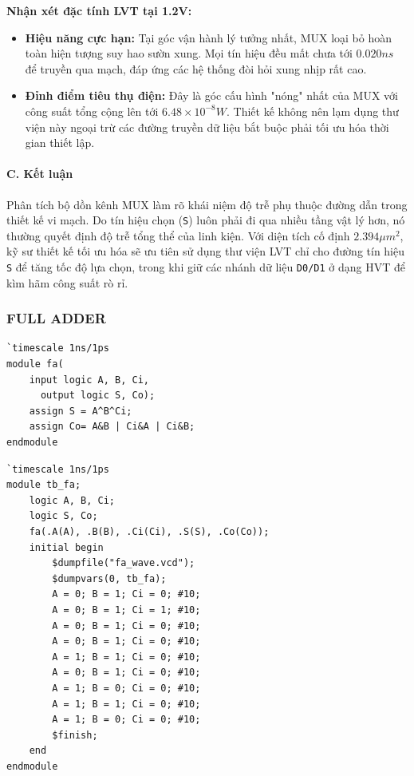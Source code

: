 \documentclass[12pt, a4paper, oneside]{article}
\begin{document}
\textbf{Nhận xét đặc tính LVT tại 1.2V:}
\begin{itemize}
    \item \textbf{Hiệu năng cực hạn:} Tại góc vận hành lý tưởng nhất, MUX loại bỏ hoàn toàn hiện tượng suy hao sườn xung. Mọi tín hiệu đều mất chưa tới $0.020ns$ để truyền qua mạch, đáp ứng các hệ thống đòi hỏi xung nhịp rất cao.
    \item \textbf{Đỉnh điểm tiêu thụ điện:} Đây là góc cấu hình "nóng" nhất của MUX với công suất tổng cộng lên tới $6.48 \times 10^{-8}W$. Thiết kế không nên lạm dụng thư viện này ngoại trừ các đường truyền dữ liệu bắt buộc phải tối ưu hóa thời gian thiết lập.
\end{itemize}

\paragraph{C. Kết luận} 
Phân tích bộ dồn kênh MUX làm rõ khái niệm độ trễ phụ thuộc đường dẫn trong thiết kế vi mạch. Do tín hiệu chọn (\texttt{S}) luôn phải đi qua nhiều tầng vật lý hơn, nó thường quyết định độ trễ tổng thể của linh kiện. Với diện tích cố định $2.394 \mu m^2$, kỹ sư thiết kế tối ưu hóa sẽ ưu tiên sử dụng thư viện LVT chỉ cho đường tín hiệu \texttt{S} để tăng tốc độ lựa chọn, trong khi giữ các nhánh dữ liệu \texttt{D0/D1} ở dạng HVT để kìm hãm công suất rò rỉ.

\newpage
\subsubsection{FULL ADDER}
\begin{lstlisting}[style={prettyverilog}, caption={\texttt{code thiết kế Full Adder}}]
`timescale 1ns/1ps
module fa(
    input logic A, B, Ci,
      output logic S, Co);
    assign S = A^B^Ci;
    assign Co= A&B | Ci&A | Ci&B;
endmodule
\end{lstlisting}
\begin{lstlisting}[style={prettyverilog}, caption={\texttt{code testbench Full Adder}}]
`timescale 1ns/1ps
module tb_fa;
    logic A, B, Ci;
    logic S, Co;
    fa(.A(A), .B(B), .Ci(Ci), .S(S), .Co(Co));
    initial begin
        $dumpfile("fa_wave.vcd");
        $dumpvars(0, tb_fa);
        A = 0; B = 1; Ci = 0; #10;
        A = 0; B = 1; Ci = 1; #10;
        A = 0; B = 1; Ci = 0; #10;
        A = 0; B = 1; Ci = 0; #10;
        A = 1; B = 1; Ci = 0; #10;
        A = 0; B = 1; Ci = 0; #10;
        A = 1; B = 0; Ci = 0; #10;
        A = 1; B = 1; Ci = 0; #10;
        A = 1; B = 0; Ci = 0; #10;
        $finish;
    end
endmodule
\end{lstlisting}
\end{document}
